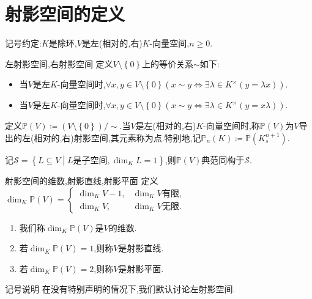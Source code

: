 \section{射影空间的定义}

记号约定:$K$是除环,$V$是左(相对的,右)$K$-向量空间,$n\geq 0$.

\begin{definition}{左射影空间,右射影空间}{}
	定义$V\setminus\left\{0\right\}$上的等价关系$\sim$如下:
	\begin{itemize}
		\item 当$V$是左$K$-向量空间时,$\forall x,y\in V\setminus\left\{0\right\}\left(x\sim y\iff\exists \lambda\in K^{\times}\left(y=\lambda x\right)\right)$.
		\item 当$V$是左$K$-向量空间时,$\forall x,y\in V\setminus\left\{0\right\}\left(x\sim y\iff\exists \lambda\in K^{\times}\left(y=x\lambda \right)\right)$.
	\end{itemize}
	定义$\mathbb{P}\left(V\right)\coloneq\left(V\setminus\left\{0\right\}\right)/\sim$.当$V$是左(相对的,右)$K$-向量空间时,称$\mathbb{P}\left(V\right)$为$V$导出的左(相对的,右)射影空间,其元素称为点.特别地,记$\mathbb{P}_{n}\left(K\right)\coloneq\mathbb{P}\left(K_{s}^{n+1}\right)$.
\end{definition}

\begin{remark}{}{}
	记$\mathcal{S}=\left\{L\subseteq V\middle|L\text{是子空间},\dim_{K}L=1\right\}$,则$\mathbb{P}\left(V\right)$典范同构于$\mathcal{S}$.
\end{remark}

\begin{definition}{射影空间的维数,射影直线,射影平面}{}
	定义$\dim_{K}\mathbb{P}\left(V\right)=
	\begin{cases}
		\dim_{K}V-1,&\dim_{K}V\text{有限},\\
		\dim_{K}V,&\dim_{K}V\text{无限}.
	\end{cases}$
	\begin{enumerate}
		\item 我们称$\dim_{K}\mathbb{P}\left(V\right)$是$V$的维数.
		\item 若$\dim_{K}\mathbb{P}\left(V\right)=1$,则称$V$是射影直线.
		\item 若$\dim_{K}\mathbb{P}\left(V\right)=2$,则称$V$是射影平面.
	\end{enumerate}
\end{definition}

\begin{remark}{记号说明}{}
	在没有特别声明的情况下,我们默认讨论左射影空间.
\end{remark}









